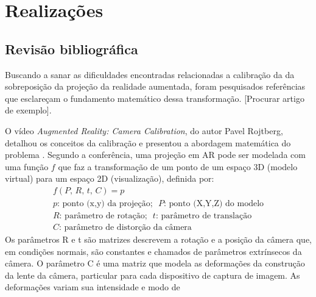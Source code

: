 \chapter{Realizações}

\section{Revisão bibliográfica}\label{chp:biblio}

Buscando a sanar as dificuldades encontradas relacionadas a calibração da da sobreposição da projeção da realidade aumentada, foram pesquisados referências que esclareçam o fundamento matemático dessa transformação. [Procurar artigo de exemplo].

O vídeo \textit{Augmented Reality: Camera Calibration}, do autor Pavel Rojtberg, detalhou os conceitos da calibração e presentou a abordagem matemática do problema \cite{augmented-calib}. Segundo a conferência, uma projeção em AR pode ser modelada com uma função \(f\) que faz a transformação de um ponto de um espaço 3D (modelo virtual) para um espaço 2D (visualização), definida por: 
\begin{gather*}
    f(P,\,R,\,t,\,C) = p \\
    \text{$p$: ponto (x,y) da projeção; ~$P$: ponto (X,Y,Z) do modelo} \\
    \text{$R$: parâmetro de rotação; ~$t$: parâmetro de translação} \\
    \text{$C$: parâmetro de distorção da câmera} 
  \end{gather*}
Os parâmetros R e t são matrizes descrevem a rotação e a posição da câmera que, em condições normais, são constantes e chamados de parâmetros extrínsecos da câmera. O parâmetro C é uma matriz que modela as deformações da construção da lente da câmera, particular para cada dispositivo de captura de imagem. As deformações variam sua intensidade e modo de 


